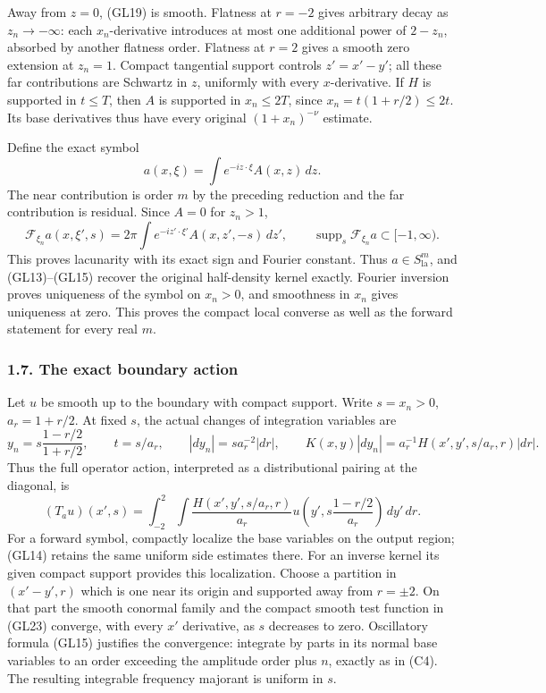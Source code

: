 \documentclass[
  11pt,
]{article}
\begin{document}
Away from \(z=0\), (GL19) is smooth. Flatness at \(r=-2\) gives
arbitrary decay as \(z_n\to-\infty\): each \(x_n\)-derivative introduces
at most one additional power of \(2-z_n\), absorbed by another flatness
order. Flatness at \(r=2\) gives a smooth zero extension at \(z_n=1\).
Compact tangential support controls \(z'=x'-y'\); all these far
contributions are Schwartz in \(z\), uniformly with every
\(x\)-derivative. If \(H\) is supported in \(t\le T\), then \(A\) is
supported in \(x_n\le2T\), since \(x_n=t(1+r/2)\le2t\). Its base
derivatives thus have every original \((1+x_n)^{-\nu}\) estimate.

Define the exact symbol \[
 a(x,\xi)=\int e^{-iz\cdot\xi}A(x,z)\,dz .
 \tag{GL20}
\] The near contribution is order \(m\) by the preceding reduction and
the far contribution is residual. Since \(A=0\) for \(z_n>1\), \[
 \mathcal F_{\xi_n}a(x,\xi',s)
 =2\pi\int e^{-iz'\cdot\xi'}A(x,z',-s)\,dz',
 \qquad \operatorname{supp}_s\mathcal F_{\xi_n}a\subset[-1,\infty).
 \tag{GL21}
\] This proves lacunarity with its exact sign and Fourier constant. Thus
\(a\in S_{\mathrm{la}}^m\), and (GL13)--(GL15) recover the original
half-density kernel exactly. Fourier inversion proves uniqueness of the
symbol on \(x_n>0\), and smoothness in \(x_n\) gives uniqueness at zero.
This proves the compact local converse as well as the forward statement
for every real \(m\).

\subsubsection{1.7. The exact boundary
action}\label{the-exact-boundary-action}

Let \(u\) be smooth up to the boundary with compact support. Write
\(s=x_n>0\), \(a_r=1+r/2\). At fixed \(s\), the actual changes of
integration variables are \[
 y_n=s\frac{1-r/2}{1+r/2},\qquad
 t=s/a_r,\qquad |dy_n|=s a_r^{-2}|dr|,
 \qquad K(x,y)|dy_n|=a_r^{-1}H(x',y',s/a_r,r)|dr|.
 \tag{GL22}
\] Thus the full operator action, interpreted as a distributional
pairing at the diagonal, is \[
 (T_a u)(x',s)=\int_{-2}^{2}\int
 \frac{H(x',y',s/a_r,r)}{a_r}
 u\left(y',s\frac{1-r/2}{a_r}\right)\,dy'\,dr .
 \tag{GL23}
\] For a forward symbol, compactly localize the base variables on the
output region; (GL14) retains the same uniform side estimates there. For
an inverse kernel its given compact support provides this localization.
Choose a partition in \((x'-y',r)\) which is one near its origin and
supported away from \(r=\pm2\). On that part the smooth conormal family
and the compact smooth test function in (GL23) converge, with every
\(x'\) derivative, as \(s\) decreases to zero. Oscillatory formula
(GL15) justifies the convergence: integrate by parts in its normal base
variables to an order exceeding the amplitude order plus \(n\), exactly
as in (C4). The resulting integrable frequency majorant is uniform in
\(s\).
\end{document}

